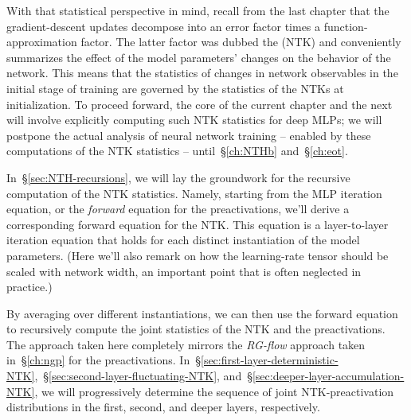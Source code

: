 With that statistical perspective in mind, recall from the last chapter that the gradient-descent 
updates decompose 
into an error factor times a function-approximation factor. The latter factor was dubbed the  (NTK) and conveniently summarizes the effect of the model parameters' changes on the behavior of the network.  
This means that the statistics of changes in network observables
in the initial stage of training are governed by the statistics of the NTKs at initialization.
To proceed forward, the core of the current chapter and the next will involve explicitly computing such NTK statistics for deep MLPs; we will postpone the actual analysis of neural network training -- enabled by these computations of the NTK statistics -- until~\S\ref{ch:NTHb} and~\S\ref{ch:eot}. 







In~\S\ref{sec:NTH-recursions}, we will lay the groundwork for the recursive computation of the NTK statistics. Namely, starting from the MLP iteration equation, or the \emph{forward} equation for the preactivations, we'll derive a corresponding forward equation for the NTK.
This equation is a layer-to-layer iteration equation that holds for each distinct instantiation of the model parameters.
(Here we'll also remark on how the learning-rate tensor should be scaled with network width, an important point that is often neglected in practice.) %


By averaging over different instantiations, we can then use the forward equation to recursively compute the joint statistics of the NTK and the preactivations.  %
The approach taken here completely mirrors the \emph{RG-flow} approach taken in~\S\ref{ch:ngp} for the preactivations. In~\S\ref{sec:first-layer-deterministic-NTK},~\S\ref{sec:second-layer-fluctuating-NTK}, and~\S\ref{sec:deeper-layer-accumulation-NTK}, we will progressively determine the sequence of joint NTK-preactivation distributions in the first, second, and deeper layers, respectively.

     
  

  






















